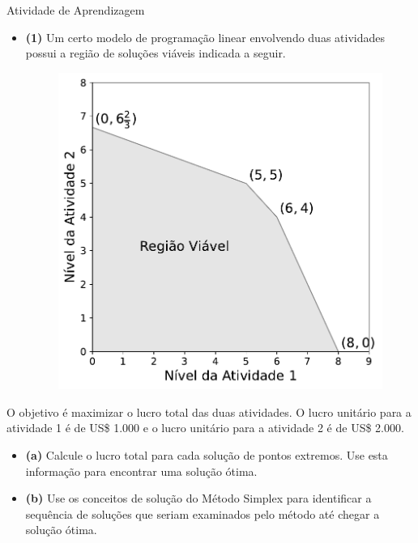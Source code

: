 \documentclass{if-beamer}
\begin{document}
\begin{frame}{Atividade de Aprendizagem}

\begin{minipage}[t]{.49\textwidth}
\begin{itemize}
\justifying
    \item \textbf{(1)} Um certo modelo de programação linear envolvendo duas atividades possui a região de soluções viáveis indicada a seguir.

    \begin{figure}
        \centering
        \includegraphics[scale=0.35]{figuras/exerc_4.1-3.pdf}
    \end{figure}
\end{itemize}
\end{minipage}\hfill
\begin{minipage}[t]{.49\textwidth}
\justifying
O objetivo é maximizar o lucro total das duas atividades. O lucro unitário para a atividade 1 é de US\$ 1.000 e o lucro unitário para a atividade 2 é de US\$ 2.000.
\begin{itemize}
    \justifying
    \item \textbf{(a)} Calcule o lucro total para cada solução de pontos extremos. Use esta informação para encontrar uma solução ótima.
    \item \textbf{(b)} Use os conceitos de solução do Método Simplex para identificar a sequência de soluções que seriam examinados pelo método até chegar a solução ótima.
\end{itemize}
\end{minipage}

\end{frame}
\end{document}
